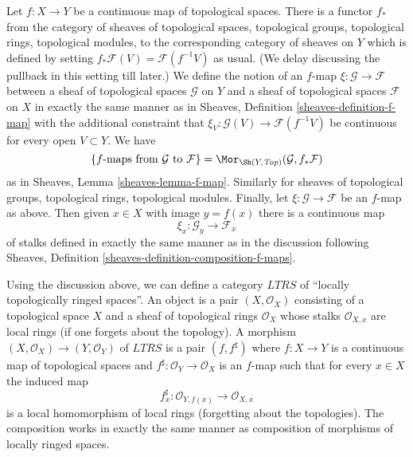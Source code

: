 \medskip\noindent
Let $f : X \to Y$ be a continuous map of topological spaces.
There is a functor $f_*$ from the category of sheaves of topological
spaces, topological groups, topological rings, topological modules,
to the corresponding category of sheaves on $Y$ which is defined by setting
$f_*\mathcal{F}(V) = \mathcal{F}(f^{-1}V)$ as usual.
(We delay discussing the pullback in this setting till later.)
We define the notion of an $f$-map $\xi : \mathcal{G} \to \mathcal{F}$
between a sheaf of topological spaces $\mathcal{G}$ on $Y$ and
a sheaf of topological spaces $\mathcal{F}$ on $X$ in exactly the
same manner as in Sheaves, Definition \ref{sheaves-definition-f-map}
with the additional constraint that
$\xi_V : \mathcal{G}(V) \to \mathcal{F}(f^{-1}V)$ be continuous
for every open $V \subset Y$. We have
$$
\{f\text{-maps from }\mathcal{G}\text{ to }\mathcal{F}\} =
\Mor_{\Sh(Y, \textit{Top})}(\mathcal{G}, f_*\mathcal{F})
$$
as in Sheaves, Lemma \ref{sheaves-lemma-f-map}. Similarly for
sheaves of topological groups, topological rings, topological modules. Finally,
let $\xi : \mathcal{G} \to \mathcal{F}$ be an $f$-map as above.
Then given $x \in X$ with image $y = f(x)$ there is a continuous
map
$$
\xi_x : \mathcal{G}_y \longrightarrow \mathcal{F}_x
$$
of stalks defined in exactly the same manner as in the discussion
following Sheaves, Definition \ref{sheaves-definition-composition-f-maps}.

\medskip\noindent
Using the discussion above, we can define a category $LTRS$ of
``locally topologically ringed spaces''. An object is a pair
$(X, \mathcal{O}_X)$ consisting of a topological space
$X$ and a sheaf of topological rings $\mathcal{O}_X$ whose stalks
$\mathcal{O}_{X, x}$ are local rings (if one forgets about the topology).
A morphism $(X, \mathcal{O}_X) \to (Y, \mathcal{O}_Y)$ of
$LTRS$ is a pair $(f, f^\sharp)$ where $f : X \to Y$ is a continuous
map of topological spaces and $f^\sharp : \mathcal{O}_Y \to \mathcal{O}_X$
is an $f$-map such that for every $x \in X$ the induced map
$$
f^\sharp_x : \mathcal{O}_{Y, f(x)} \longrightarrow \mathcal{O}_{X, x}
$$
is a local homomorphism of local rings (forgetting about the topologies).
The composition works in exactly the same manner as composition of
morphisms of locally ringed spaces.

